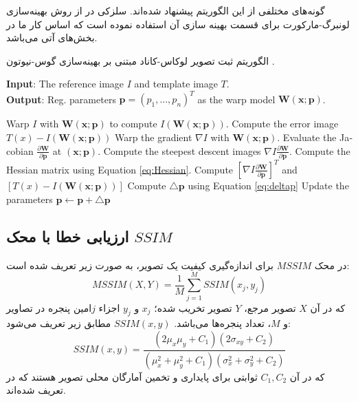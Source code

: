 \documentclass[11pt,a4paper,twocolumn]{article}
\newcommand{\warp}{\mathbf{W}(\mathbf{x};\mathbf{p})}
\newcommand{\IWarp}{I(\mathbf{W}(\mathbf{x};\mathbf{p}))}
\newcommand{\roundB}[2]{\frac{\partial{\mathbf{#1}}}{\partial{\mathbf{#2}}}}
\begin{document}
گونه‌های مختلفی از این الگوریتم پیشنهاد شده‌اند. سلزکی در \cite{Szeliski96video} از روش بهینه‌سازی لونبرگ-مارکورت برای قسمت بهینه سازی آن استفاده نموده است که اساس کار ما در بخش‌های آتی می‌باشد.
\begin{algorithm}[t]
\caption{الگوریتم ثبت تصویر لوکاس-کاناد مبتنی بر بهینه‌سازی گوس-نیوتون .} \label{alg1}
\singlespacing
\begin{latin}
\textbf{Input}:
The reference image $I$ and template image $T$.\\
\textbf{Output}: Reg. parameters
$\mathbf{p}=(p_1,\dots,p_n)^T$ as the warp model $\warp$.
\begin{algorithmic}[1]
\REPEAT
  \STATE Warp $I$ with $\warp$ to compute $\IWarp$. 
  \STATE Compute the error image $T(x)-\IWarp$ 
  \STATE Warp the gradient $\nabla I$ with $\warp$. \STATE Evaluate the Jacobian
    $\roundB{W}{p}$ at $(\mathbf{x;p})$. 
  \STATE Compute the steepest descent images $\nabla I\roundB{W}{p}$. 
  \STATE \label{line:Hessian} Compute the Hessian matrix using Equation
    \eqref{eq:Hessian}. 
  \STATE Compute $[\nabla I\roundB{W}{p}]^T$ and $[T(x)-\IWarp]$ 
  \STATE \label{alg1:deltap} Compute $\triangle\mathbf{p}$ using Equation \eqref{eq:deltap} 
  \STATE Update the parameters $\mathbf{p}\leftarrow\mathbf{p}+\triangle\mathbf{p}$ 
\end{algorithmic}
\end{latin}
\end{algorithm}


\subsection{ارزیابی خطا با محک $SSIM$}
در \cite{Wang04image} محک $MSSIM$ برای اندازه‌گیری کیفیت یک تصویر، به صورت زیر تعریف شده است:
\begin{equation}\label{eq:MSSIM}
    MSSIM(X,Y) = \frac{1}{M}\sum_{j=1}^M SSIM(x_j,y_j)
\end{equation}
که در آن $X$ تصویر مرجع، $Y$ تصویر تخریب شده؛ $x_j$ و $y_j$ اجزاء $j$امین پنجره در تصاویر و $M$، تعداد پنجره‌ها می‌باشد. 
$SSIM(x,y)$ مطابق زیر تعریف می‌شود:
\begin{equation}\label{eq:SSIM}
    SSIM(x,y)=\frac{(2\mu_x\mu_y+C_1)(2\sigma_{xy}+C_2)}{(\mu_x^2+\mu_y^2+C_1)(\sigma_x^2+\sigma_y^2+C_2)}
\end{equation}
که در آن $C_1,C_2$ ثوابتی برای پایداری و  تخمین آمارگان محلی تصویر هستند که در \cite{Wang04image} تعریف شده‌اند. 
\end{document}
